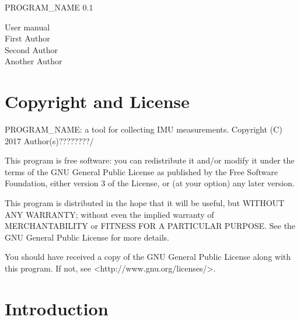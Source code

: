 \documentclass[11pt,letterpaper,article,oneside]{memoir}
\newcommand{\name}{PROGRAM\_NAME}
\newcommand{\programVersion}{0.1}
\newcommand{\manualVersion}{0.1}
\begin{document}
\thispagestyle{empty}

{%
\centering
\Large

\vspace*{\fill}

{\huge
\name{} \programVersion{}
}

{\LARGE
User manual \\
\vspace{2.5cm}
First Author \\
Second Author \\
Another Author \\
}
\vspace*{\fill}

}

\cleardoublepage

\tableofcontents*

\clearpage




\chapter{Copyright and License}

\name{}: a tool for collecting IMU measurements.
Copyright (C) 2017 Author(s)????????/

This program is free software: you can redistribute it and/or modify
it under the terms of the GNU General Public License as published by
the Free Software Foundation, either version 3 of the License, or
(at your option) any later version.

This program is distributed in the hope that it will be useful,
but WITHOUT ANY WARRANTY; without even the implied warranty of
MERCHANTABILITY or FITNESS FOR A PARTICULAR PURPOSE.  See the
GNU General Public License for more details.

You should have received a copy of the GNU General Public License
along with this program.  If not, see <http://www.gnu.org/licenses/>.




\chapter{Introduction}
\end{document}
